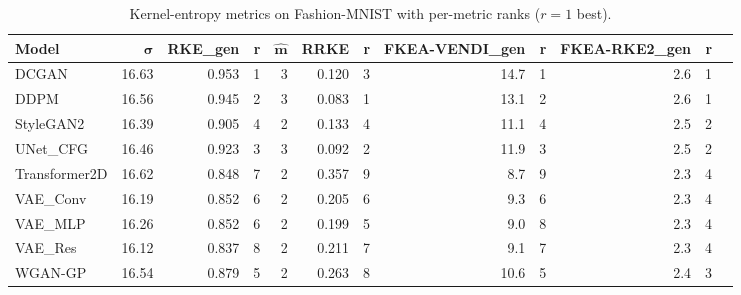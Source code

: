 \begin{table}[H]
\centering
\small
\caption{Kernel-entropy metrics on Fashion-MNIST with per-metric ranks ($r{=}1$ best).}
\label{tab:ke-fashionmnist-ranked}
\begin{tabular}{lrrrrrrrrrrr}
\toprule
\textbf{Model} & $\boldsymbol{\sigma}$ & \textbf{RKE\_gen} & \textbf{r} & $\boldsymbol{\hat m}$ & \textbf{RRKE} & \textbf{r} & \textbf{FKEA-VENDI\_gen} & \textbf{r} & \textbf{FKEA-RKE2\_gen} & \textbf{r} \\
\midrule
DCGAN         & 16.63 & 0.953 & 1 & 3 & 0.120 & 3 & 14.7 & 1 & 2.6 & 1 \\
DDPM          & 16.56 & 0.945 & 2 & 3 & 0.083 & 1 & 13.1 & 2 & 2.6 & 1 \\
StyleGAN2     & 16.39 & 0.905 & 4 & 2 & 0.133 & 4 & 11.1 & 4 & 2.5 & 2 \\
UNet\_CFG     & 16.46 & 0.923 & 3 & 3 & 0.092 & 2 & 11.9 & 3 & 2.5 & 2 \\
Transformer2D & 16.62 & 0.848 & 7 & 2 & 0.357 & 9 &  8.7 & 9 & 2.3 & 4 \\
VAE\_Conv     & 16.19 & 0.852 & 6 & 2 & 0.205 & 6 &  9.3 & 6 & 2.3 & 4 \\
VAE\_MLP      & 16.26 & 0.852 & 6 & 2 & 0.199 & 5 &  9.0 & 8 & 2.3 & 4 \\
VAE\_Res      & 16.12 & 0.837 & 8 & 2 & 0.211 & 7 &  9.1 & 7 & 2.3 & 4 \\
WGAN-GP        & 16.54 & 0.879 & 5 & 2 & 0.263 & 8 & 10.6 & 5 & 2.4 & 3 \\
\bottomrule
\end{tabular}
\end{table}

